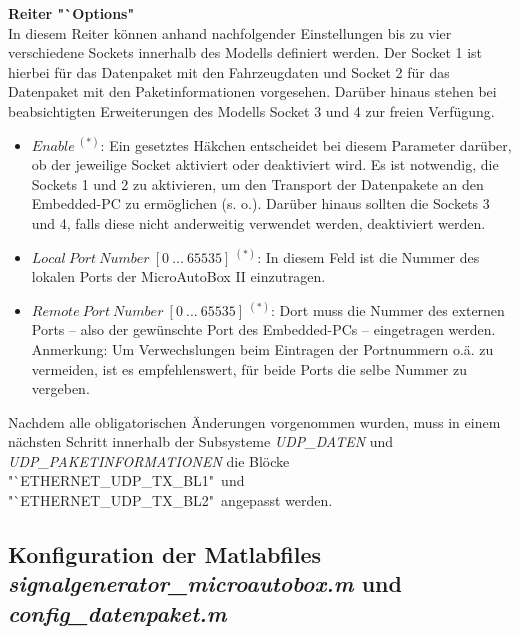 \documentclass[fontsize = 12pt, paper = a4]{scrreprt}
\begin{document}
\textbf{Reiter "`Options"} \\

In diesem Reiter können anhand nachfolgender Einstellungen bis zu vier verschiedene Sockets innerhalb des Modells definiert werden. Der Socket 1 ist hierbei für das Datenpaket mit den Fahrzeugdaten und Socket 2 für das Datenpaket mit den Paketinformationen vorgesehen. Darüber hinaus stehen bei beabsichtigten Erweiterungen des Modells Socket 3 und 4 zur freien Verfügung.

\begin{itemize}

\item \textit{$Enable \ ^{(*)}$}: Ein gesetztes Häkchen entscheidet bei diesem Parameter darüber, ob der jeweilige Socket aktiviert oder deaktiviert wird. Es ist notwendig, die Sockets 1 und 2 zu aktivieren, um den Transport der Datenpakete an den Embedded-PC zu ermöglichen (s. o.). Darüber hinaus sollten die Sockets 3 und 4, falls diese nicht anderweitig verwendet werden, deaktiviert werden.  

\item \textit{$Local \ Port \ Number \ [0 \ ... \ 65535] \ ^{(*)}$}: In diesem Feld ist die Nummer des lokalen Ports der MicroAutoBox II einzutragen. 

\item \textit{$Remote \ Port \ Number \ [0 \ ... \ 65535] \ ^{(*)}$}:
Dort muss die Nummer des externen Ports -- also der gewünschte Port des Embedded-PCs -- eingetragen werden. \\ Anmerkung: Um Verwechslungen beim Eintragen der Portnummern o.ä. zu vermeiden, ist es empfehlenswert, für beide Ports die selbe Nummer zu vergeben. 

\end{itemize} 

Nachdem alle obligatorischen Änderungen vorgenommen wurden, muss in einem nächsten Schritt innerhalb der Subsysteme \textit{UDP\_DATEN} und \textit{UDP\_PAKETINFORMATIONEN} die Blöcke "`ETHERNET\_UDP\_TX\_BL1"\ und "`ETHERNET\_UDP\_TX\_BL2"\ angepasst werden.

\newpage


\subsection{Konfiguration der Matlabfiles \textit{signalgenerator\_microautobox.m} und \textit{config\_datenpaket.m}}
\end{document}
